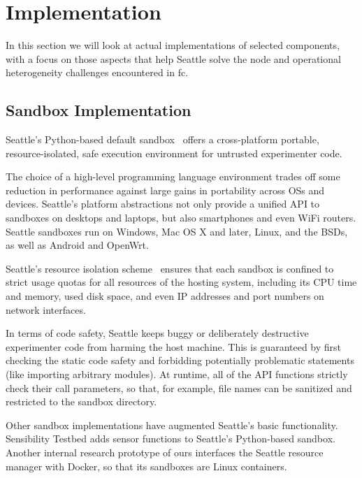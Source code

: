 \section{Implementation}

In this section we will look at actual implementations of
selected components, with a focus on those aspects that help
Seattle solve the node and operational heterogeneity
challenges encountered in \gls{fc}.

\subsection{Sandbox Implementation}

Seattle's Python-based default sandbox~\cite{RepySandbox}
offers a cross-platform portable, resource-isolated,
safe execution environment for untrusted experimenter code.

The choice of a high-level programming language environment trades
off some reduction in performance against large gains in portability
across \glspl{OS} and devices. Seattle's platform abstractions not only
provide a unified \gls{API} to sandboxes on desktops and laptops,
but also smartphones and even WiFi routers. Seattle sandboxes
run on Windows, Mac OS X and later, Linux, and the \glspl{BSD}, as
well as Android and OpenWrt.

Seattle's resource isolation scheme~\cite{li2015fence} ensures
that each sandbox is confined to strict usage quotas for all
resources of the hosting system, including its \gls{CPU} time and
memory, used disk space, and even \gls{IP} addresses and port numbers
on network interfaces.

In terms of code safety, Seattle keeps buggy or deliberately destructive
experimenter code from harming the host machine. This is guaranteed
by first checking the static code safety and forbidding potentially
problematic statements (like importing arbitrary modules). At runtime,
all of the \gls{API} functions strictly check their call parameters,
so that, for example, file names can be sanitized and restricted to the
sandbox directory.

Other sandbox implementations have augmented Seattle's basic functionality.
Sensibility Testbed adds sensor functions to Seattle's Python-based
sandbox. Another internal research prototype of ours interfaces the
Seattle resource manager with Docker, so that its sandboxes are
Linux containers.



